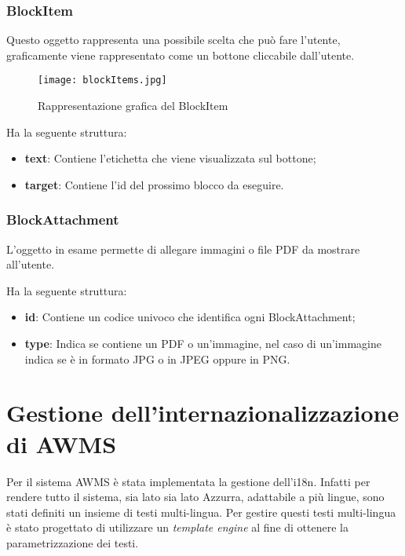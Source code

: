 \subsubsection*{BlockItem}
Questo oggetto rappresenta una possibile scelta che può fare l'utente, graficamente viene rappresentato come un bottone cliccabile dall'utente.

\begin{figure}[h]
	\centering
	\texttt{[image: blockItems.jpg]}
	\caption{Rappresentazione grafica del BlockItem}
\end{figure}
Ha la seguente struttura:

\begin{itemize}
	\item \textbf{text}: Contiene l'etichetta che viene visualizzata sul bottone;
	\item \textbf{target}: Contiene l'id del prossimo blocco da eseguire.
\end{itemize}

\subsubsection*{BlockAttachment} 
L'oggetto in esame permette di allegare immagini o file PDF da mostrare all'utente.

Ha la seguente struttura:

\begin{itemize}
	\item \textbf{id}: Contiene un codice univoco che identifica ogni BlockAttachment;
	\item \textbf{type}: Indica se contiene un PDF o un'immagine, nel caso di un'immagine indica se è in formato JPG o in JPEG oppure in PNG.
\end{itemize}	

\section{Gestione dell'internazionalizzazione di AWMS}%
Per il sistema \gls{AWMS} è stata implementata la gestione dell'\gls{i18n}. Infatti per rendere tutto il sistema, sia lato  sia lato Azzurra, adattabile a più lingue, sono stati definiti un insieme di testi multi-lingua. Per gestire questi testi multi-lingua è stato progettato di utilizzare un \emph{template engine} al fine di ottenere la parametrizzazione dei testi. \\

